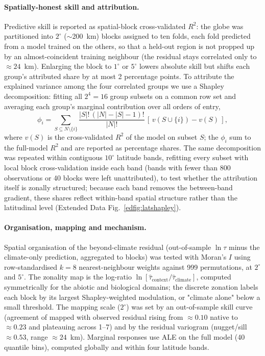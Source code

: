 \documentclass[12pt, a4paper]{article}
\begin{document}
\paragraph{Spatially-honest skill and attribution.}
Predictive skill is reported as spatial-block cross-validated $R^2$: the globe was
partitioned into $2^{\circ}$ ($\sim$200~km) blocks assigned to ten folds, each
fold predicted from a model trained on the others, so that a held-out region is not
propped up by an almost-coincident training neighbour (the residual stays correlated
only to $\approx24$~km). Enlarging the block to $1^{\circ}$ or $5^{\circ}$ lowers absolute
skill but shifts each group's attributed share by at most 2 percentage points. To
attribute the explained variance among the four correlated groups we use a Shapley
decomposition: fitting all $2^4=16$ group subsets on a common row set and averaging
each group's marginal contribution over all orders of entry,
\begin{equation}
  \phi_i = \!\!\sum_{S\subseteq N\setminus\{i\}}
  \frac{|S|!\,(|N|-|S|-1)!}{|N|!}\,[\,v(S\cup\{i\})-v(S)\,],
  \label{eq:shapley}
\end{equation}
where $v(S)$ is the cross-validated $R^2$ of the model on subset $S$; the $\phi_i$
sum to the full-model $R^2$ and are reported as percentage shares. The same
decomposition was repeated within contiguous $10^{\circ}$ latitude bands,
refitting every subset with local block cross-validation inside each band (bands with
fewer than 800 observations or 40 blocks were left unattributed), to test whether the
attribution itself is zonally structured; because each band removes the between-band
gradient, these shares reflect within-band spatial structure rather than the
latitudinal level (Extended Data Fig.~\ref{edfig:latshapley}).

\paragraph{Organisation, mapping and mechanism.}
Spatial organisation of the beyond-climate residual (out-of-sample $\ln\tau$ minus
the climate-only prediction, aggregated to blocks) was tested with Moran's $I$ using
row-standardised $k=8$ nearest-neighbour weights against 999 permutations, at
$2^{\circ}$ and $5^{\circ}$. The zonality map is the log-ratio
$\ln[\hat\tau_\text{context}/\hat\tau_\text{climate}]$, computed symmetrically for
the abiotic and biological domains; the discrete zonation labels each block by its
largest Shapley-weighted modulation, or "climate alone" below a small threshold. The
mapping scale ($2^{\circ}$) was set by an out-of-sample skill curve (agreement of
mapped with observed residual rising from $\approx0.10$ native to $\approx0.23$ and
plateauing across 1--7\textdegree) and by the residual variogram (nugget/sill
$\approx0.53$, range $\approx24$~km). Marginal responses use ALE \citep{Apley2020}
on the full model (40 quantile bins), computed globally and within four latitude
bands.
\end{document}
